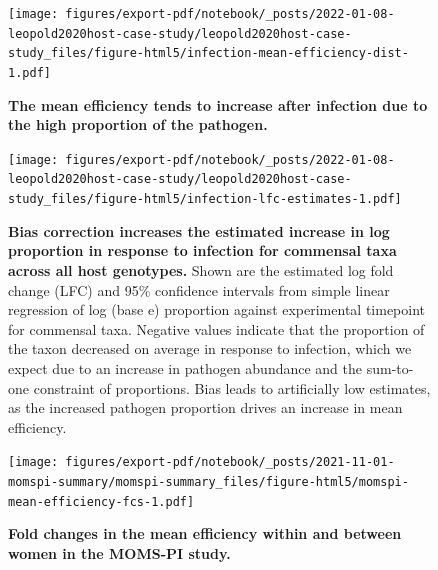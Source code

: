 \documentclass[
]{article}
\begin{document}
\begin{figure}
\centering
\texttt{[image: figures/export-pdf/notebook/\_posts/2022-01-08-leopold2020host-case-study/leopold2020host-case-study\_files/figure-html5/infection-mean-efficiency-dist-1.pdf]}
\caption{\label{fig:leopold2020host-infection-mean-efficiency-dist}\textbf{The mean efficiency tends to increase after infection due to the high proportion of the pathogen.}}
\end{figure}



\begin{figure}
\centering
\texttt{[image: figures/export-pdf/notebook/\_posts/2022-01-08-leopold2020host-case-study/leopold2020host-case-study\_files/figure-html5/infection-lfc-estimates-1.pdf]}
\caption{\label{fig:leopold2020host-infection-lfc}\textbf{Bias correction increases the estimated increase in log proportion in response to infection for commensal taxa across all host genotypes.} Shown are the estimated log fold change (LFC) and 95\% confidence intervals from simple linear regression of log (base e) proportion against experimental timepoint for commensal taxa. Negative values indicate that the proportion of the taxon decreased on average in response to infection, which we expect due to an increase in pathogen abundance and the sum-to-one constraint of proportions. Bias leads to artificially low estimates, as the increased pathogen proportion drives an increase in mean efficiency.}
\end{figure}



\begin{figure}
\centering
\texttt{[image: figures/export-pdf/notebook/\_posts/2021-11-01-momspi-summary/momspi-summary\_files/figure-html5/momspi-mean-efficiency-fcs-1.pdf]}
\caption{\label{fig:momspi-mean-efficiency-fcs}\textbf{Fold changes in the mean efficiency within and between women in the MOMS-PI study.}}
\end{figure}
\end{document}
